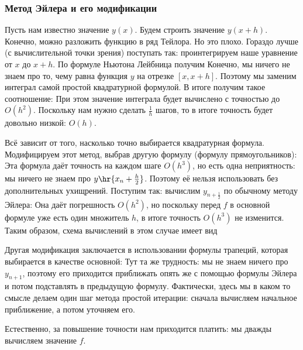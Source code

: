 \documentclass[a4paper]{article}
\newcommand{\dt}{\,dt} \newcommand{\dy}{\,dy}
\begin{document}
\subsubsection{Метод Эйлера и его модификации}

Пусть нам известно значение $y(x)$. Будем строить значение $y(x+h)$.
Конечно, можно разложить функцию в ряд Тейлора. Но это плохо. Гораздо
лучше (с вычислительной точки зрения) поступать так: проинтегрируем
наше уравнение от $x$ до $x+h$.  По формуле Ньютона Лейбница получим
\eqn{y(x+h) = y(x) +\intl{0}{h} f\br{x+t, y(x+t)}\dt.}  Конечно, мы
ничего не знаем про то, чему равна функция $y$ на отрезке $[x,x+h]$.
Поэтому мы заменим интеграл самой простой квадратурной формулой.  В
итоге получим такое соотношение: 
При этом значение интеграла будет вычислено с точностью до $O(h^2)$.
Поскольку нам нужно сделать $\frac{1}{h}$ шагов, то в итоге точность
будет довольно низкой: $O(h)$.

Всё зависит от того, насколько точно выбирается квадратурная формула.
Модифицируем этот метод, выбрав другую формулу (формулу
прямоугольников):   Эта формула даёт точность на каждом шаге
$O(h^3)$, но есть одна неприятность: мы ничего не знаем про $y\hr{x_n
  + \frac h2}$. Поэтому её нельзя использовать без дополнительных
ухищрений. Поступим так: вычислим $y_{n+\frac12}$ по обычному методу
Эйлера:   Она даёт
погрешность $O(h^2)$, но поскольку перед $f$ в основной формуле уже
есть один множитель $h$, в итоге точность $O(h^3)$ не изменится.
Таким образом, схема вычислений в этом случае имеет вид 

Другая модификация заключается в использовании формулы трапеций,
которая выбирается в качестве основной:   Тут та же трудность: мы не
знаем ничего про $y_{n+1}$, поэтому его приходится приближать опять же
с помощью формулы Эйлера  и потом
подставлять в предыдущую формулу. Фактически, здесь мы в каком то
смысле делаем один шаг метода простой итерации: сначала вычисляем
начальное приближение, а потом уточняем его.

Естественно, за повышение точности нам приходится платить: мы дважды
вычисляем значение $f$.
\end{document}
